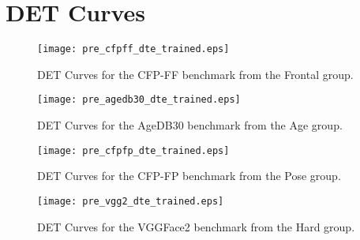 \documentclass[class=report, crop=false, a4paper, 12pt]{standalone}
\begin{document}
\section*{DET Curves}\label{sec:det_curves_appendix}
\begin{figure}[H]
    \centering
    \begin{adjustbox}{center, minipage=1.2\textwidth, margin=0cm -0.1cm 0cm -0.1cm}  %
        \begin{minipage}[c]{0.49\textwidth}
            \centering
            \texttt{[image: pre\_cfpff\_dte\_trained.eps]}
            \caption{DET Curves for the CFP-FF benchmark from the Frontal group.}
            \label{fig:dte_lfw}
        \end{minipage}
        \hfill
        \begin{minipage}[c]{0.49\textwidth}
            \centering
            \texttt{[image: pre\_agedb30\_dte\_trained.eps]}
            \caption{DET Curves for the AgeDB30 benchmark from the Age group.}
            \label{fig:dte_lfw}
        \end{minipage}
    \end{adjustbox}
    \vspace{-0.4cm}
  \end{figure}
  
\begin{figure}[H]
\begin{adjustbox}{center, minipage=1.2\textwidth, margin=0cm -0.1cm 0cm -0.1cm}  %
    \begin{minipage}[c]{0.49\textwidth}
        \centering
        \texttt{[image: pre\_cfpfp\_dte\_trained.eps]}
        \caption{DET Curves for the CFP-FP benchmark from the Pose group.}
        \label{fig:dte_cplfw}
    \end{minipage}
    \hfill
    \begin{minipage}[c]{0.49\textwidth}
        \centering
        \texttt{[image: pre\_vgg2\_dte\_trained.eps]}
        \caption{DET Curves for the VGGFace2 benchmark from the Hard group.}
        \label{fig:dte_xqlfw}
    \end{minipage}
\end{adjustbox}
\vspace{-0.4cm}
\end{figure}
\end{document}
